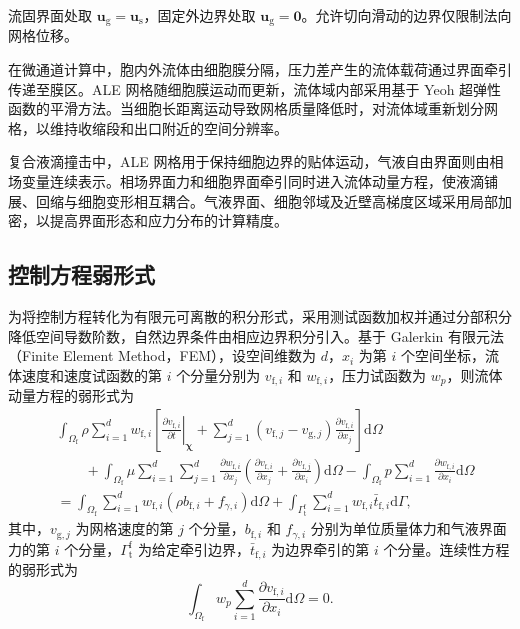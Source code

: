 流固界面处取 $\boldsymbol{u}_{\mathrm g}=\boldsymbol{u}_{\mathrm s}$，固定外边界处取 $\boldsymbol{u}_{\mathrm g}=\boldsymbol{0}$。允许切向滑动的边界仅限制法向网格位移。

在微通道计算中，胞内外流体由细胞膜分隔，压力差产生的流体载荷通过界面牵引传递至膜区。ALE 网格随细胞膜运动而更新，流体域内部采用基于 Yeoh 超弹性函数的平滑方法\cite{yeoh1993some}。当细胞长距离运动导致网格质量降低时，对流体域重新划分网格，以维持收缩段和出口附近的空间分辨率。

复合液滴撞击中，ALE 网格用于保持细胞边界的贴体运动，气液自由界面则由相场变量连续表示。相场界面力和细胞界面牵引同时进入流体动量方程，使液滴铺展、回缩与细胞变形相互耦合。气液界面、细胞邻域及近壁高梯度区域采用局部加密，以提高界面形态和应力分布的计算精度。

\subsection{控制方程弱形式}
\label{subsec:ch2_weak_form}

为将控制方程转化为有限元可离散的积分形式，采用测试函数加权并通过分部积分降低空间导数阶数，自然边界条件由相应边界积分引入。基于 Galerkin 有限元法（Finite Element Method，FEM），设空间维数为 $d$，$x_i$ 为第 $i$ 个空间坐标，流体速度和速度试函数的第 $i$ 个分量分别为 $v_{\mathrm f,i}$ 和 $w_{\mathrm f,i}$，压力试函数为 $w_p$，则流体动量方程的弱形式为
\begin{equation}
\begin{aligned}
&\int_{\Omega_{\mathrm f}}
\rho
\sum_{i=1}^{d}w_{\mathrm f,i}
\left[
\left.
\frac{\partial v_{\mathrm f,i}}{\partial t}
\right|_{\boldsymbol{\chi}}
+
\sum_{j=1}^{d}
\left(v_{\mathrm f,j}-v_{\mathrm g,j}\right)
\frac{\partial v_{\mathrm f,i}}{\partial x_j}
\right]
\mathrm d\Omega
\\
&\qquad
+
\int_{\Omega_{\mathrm f}}
\mu
\sum_{i=1}^{d}\sum_{j=1}^{d}
\frac{\partial w_{\mathrm f,i}}{\partial x_j}
\left(
\frac{\partial v_{\mathrm f,i}}{\partial x_j}
+
\frac{\partial v_{\mathrm f,j}}{\partial x_i}
\right)
\mathrm d\Omega
-
\int_{\Omega_{\mathrm f}}
p
\sum_{i=1}^{d}
\frac{\partial w_{\mathrm f,i}}{\partial x_i}
\mathrm d\Omega
\\
&=
\int_{\Omega_{\mathrm f}}
\sum_{i=1}^{d}w_{\mathrm f,i}
\left(
\rho b_{\mathrm f,i}
+
f_{\gamma,i}
\right)
\mathrm d\Omega
+
\int_{\Gamma_{\mathrm t}^{\mathrm f}}
\sum_{i=1}^{d}w_{\mathrm f,i}\bar t_{\mathrm f,i}
\mathrm d\Gamma,
\end{aligned}
\label{eq:ch2_weak_fluid_momentum}
\end{equation}
其中，$v_{\mathrm g,j}$ 为网格速度的第 $j$ 个分量，$b_{\mathrm f,i}$ 和 $f_{\gamma,i}$ 分别为单位质量体力和气液界面力的第 $i$ 个分量，$\Gamma_{\mathrm t}^{\mathrm f}$ 为给定牵引边界，$\bar t_{\mathrm f,i}$ 为边界牵引的第 $i$ 个分量。连续性方程的弱形式为
\begin{equation}
\int_{\Omega_{\mathrm f}}
w_p
\sum_{i=1}^{d}
\frac{\partial v_{\mathrm f,i}}{\partial x_i}
\mathrm d\Omega
=0.
\label{eq:ch2_weak_continuity}
\end{equation}


